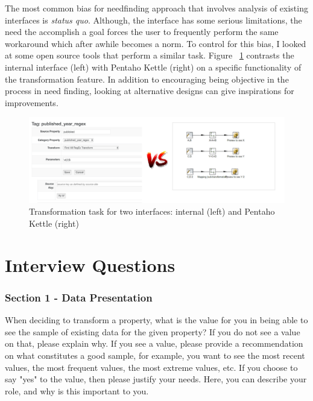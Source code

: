 \documentclass[12pt,letterpaper]{article}
\begin{document}
\bigskip
The most common bias for needfinding approach that involves analysis of existing interfaces is \textit{status quo}. Although, the interface has some serious limitations, the need the accomplish a goal forces the user to frequently perform the same workaround which after awhile becomes a norm. To control for this bias, I looked at some open source tools that perform a similar task. Figure ~\ref{fig::1} contrasts the internal interface (left) with Pentaho Kettle (right) on a specific functionality of the transformation feature. In addition to encouraging being objective in the process in need finding, looking at alternative designs can give inspirations for improvements. 

\begin{figure}[h]
\centering
\includegraphics[scale=.35]{alternatives.png}
\caption{Transformation task for two interfaces: internal (left) and Pentaho Kettle (right)}
\label{fig::1}
\end{figure}



 


\appendix

\section{Interview Questions}

\subsubsection*{Section 1 - Data Presentation}
When deciding to transform a property, what is the value for you in being able to see the sample of existing data for the given property? If you do not see a value on that, please explain why.  If you see a value, please provide a recommendation on what constitutes a good sample, for example, you want to see the most recent values, the most frequent values, the most extreme values, etc. If you choose to say "yes" to the value, then please justify your needs. Here, you can describe your role, and why is this important to you.  
\end{document}

